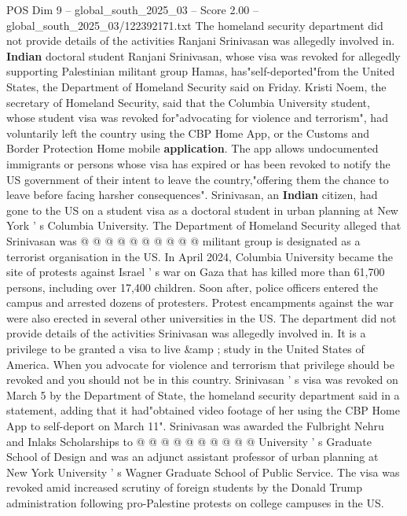 \begin{textsample}{POS Dim 9 – global\_south\_2025\_03 – Score 2.00 – global\_south\_2025\_03/122392171.txt}  \label{ex:f9_pos_046}
The homeland security department did not provide details of the activities Ranjani Srinivasan was allegedly involved in. \textbf{Indian} doctoral student Ranjani Srinivasan, whose visa was revoked for allegedly supporting Palestinian militant group Hamas, has"self-deported"from the United States, the Department of Homeland Security said on Friday.
Kristi Noem, the secretary of Homeland Security, said that the Columbia University student, whose student visa was revoked for"advocating for violence and terrorism", had voluntarily left the country using the CBP Home App, or the Customs and Border Protection Home mobile \textbf{application}.
The app allows undocumented immigrants or persons whose visa has expired or has been revoked to notify the US government of their intent to leave the country,"offering them the chance to leave before facing harsher consequences".
Srinivasan, an \textbf{Indian} citizen, had gone to the US on a student visa as a doctoral student in urban planning at New York ' s Columbia University.
The Department of Homeland Security alleged that Srinivasan was @ @ @ @ @ @ @ @ @ @ militant group is designated as a terrorist organisation in the US.
In April 2024, Columbia University became the site of protests against Israel ' s war on Gaza that has killed more than 61,700 persons, including over 17,400 children.
Soon after, police officers entered the campus and arrested dozens of protesters.
Protest encampments against the war were also erected in several other universities in the US.
The department did not provide details of the activities Srinivasan was allegedly involved in.
It is a privilege to be granted a visa to live \&amp ; study in the United States of America.
When you advocate for violence and terrorism that privilege should be revoked and you should not be in this country.
Srinivasan ' s visa was revoked on March 5 by the Department of State, the homeland security department said in a statement, adding that it had"obtained video footage of her using the CBP Home App to self-deport on March 11".
Srinivasan was awarded the Fulbright Nehru and Inlaks Scholarships to @ @ @ @ @ @ @ @ @ @ University ' s Graduate School of Design and was an adjunct assistant professor of urban planning at New York University ' s Wagner Graduate School of Public Service.
The visa was revoked amid increased scrutiny of foreign students by the Donald Trump administration following pro-Palestine protests on college campuses in the US.

\end{textsample}
